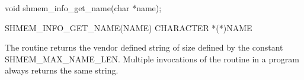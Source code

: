 \synC   %

void shmem_info_get_name(char *name); %

\synF   %

SHMEM_INFO_GET_NAME(NAME)   
CHARACTER *(*)NAME %

{
  The routine returns the vendor defined string of size defined by the 
  constant SHMEM\_MAX\_NAME\_LEN. Multiple invocations of the routine in a 
  \openshmem{} program always returns the same string.
}
{
}
\eAPI

